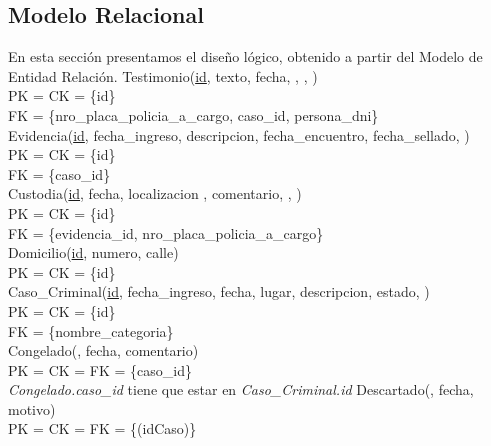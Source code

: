 \documentclass[10pt,a4paper]{article}
\begin{document}
\subsection{Modelo Relacional}
En esta sección presentamos el diseño lógico, obtenido a partir del Modelo de Entidad Relación. 
\newline
\newline
Testimonio(\underline{id}, texto, fecha, , , )\\
	PK = CK = \{id\}\\ 
	FK = \{nro\_placa\_policia\_a\_cargo, caso\_id, persona\_dni\}\\ 
\newline
Evidencia(\underline{id}, fecha\_ingreso, descripcion, fecha\_encuentro, fecha\_sellado, )\\ 
	PK = CK = \{id\} \\
	FK = \{caso\_id\}\\ 
\newline
Custodia(\underline{id}, fecha, localizacion ,  comentario, , )\\ 
	PK = CK = \{id\} \\
	FK = \{evidencia\_id, nro\_placa\_policia\_a\_cargo\}\\ 
\newline
Domicilio(\underline{id}, numero, calle)\\ 
	PK = CK = \{id\}\\ 
\newline
Caso\_Criminal(\underline{id}, fecha_ingreso, fecha, lugar, descripcion, estado, )\\ 
	PK = CK = \{id\}\\ 
	FK = \{nombre\_categoria\}\\ 
\newline
Congelado(, fecha, comentario)\\ 
	PK = CK = FK = \{caso\_id\}\\ 
\newline
\textit{Congelado.caso\_id} tiene que estar en \textit{Caso\_Criminal.id}
\newline
\newline
Descartado(, fecha, motivo)\\ 
	PK = CK = FK = \{(idCaso)\}\\ 
\newline
\end{document}
